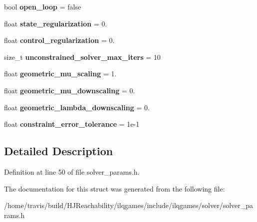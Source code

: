 \begin{DoxyCompactItemize}
\item 
bool {\bfseries open\+\_\+loop} = false\hypertarget{structilqgames_1_1_solver_params_abb3fe1fbe358304f0c80d75c104bc087}{}\label{structilqgames_1_1_solver_params_abb3fe1fbe358304f0c80d75c104bc087}

\item 
float {\bfseries state\+\_\+regularization} = 0.\hypertarget{structilqgames_1_1_solver_params_a1b78c2eb175f76f675f02bfe5f46e194}{}\label{structilqgames_1_1_solver_params_a1b78c2eb175f76f675f02bfe5f46e194}

\item 
float {\bfseries control\+\_\+regularization} = 0.\hypertarget{structilqgames_1_1_solver_params_a5a517a29fa35ce403cdcfa2e20b85d5c}{}\label{structilqgames_1_1_solver_params_a5a517a29fa35ce403cdcfa2e20b85d5c}

\item 
size\+\_\+t {\bfseries unconstrained\+\_\+solver\+\_\+max\+\_\+iters} = 10\hypertarget{structilqgames_1_1_solver_params_aaf912db6d670238b20312510c3e94b73}{}\label{structilqgames_1_1_solver_params_aaf912db6d670238b20312510c3e94b73}

\item 
float {\bfseries geometric\+\_\+mu\+\_\+scaling} = 1.\hypertarget{structilqgames_1_1_solver_params_af92b15ca298dfcdb135aa5586d4ef893}{}\label{structilqgames_1_1_solver_params_af92b15ca298dfcdb135aa5586d4ef893}

\item 
float {\bfseries geometric\+\_\+mu\+\_\+downscaling} = 0.\hypertarget{structilqgames_1_1_solver_params_a06b29332cc7d0b7b6c8b40735bf88ce5}{}\label{structilqgames_1_1_solver_params_a06b29332cc7d0b7b6c8b40735bf88ce5}

\item 
float {\bfseries geometric\+\_\+lambda\+\_\+downscaling} = 0.\hypertarget{structilqgames_1_1_solver_params_a9cba5d95632bfe1b13210f9e57a04d90}{}\label{structilqgames_1_1_solver_params_a9cba5d95632bfe1b13210f9e57a04d90}

\item 
float {\bfseries constraint\+\_\+error\+\_\+tolerance} = 1e-\/1\hypertarget{structilqgames_1_1_solver_params_a234a11a966006b991ec7ddfd59c94cef}{}\label{structilqgames_1_1_solver_params_a234a11a966006b991ec7ddfd59c94cef}

\end{DoxyCompactItemize}


\subsection{Detailed Description}


Definition at line 50 of file solver\+\_\+params.\+h.



The documentation for this struct was generated from the following file\+:\begin{DoxyCompactItemize}
\item 
/home/travis/build/\+H\+J\+Reachability/ilqgames/include/ilqgames/solver/solver\+\_\+params.\+h\end{DoxyCompactItemize}
